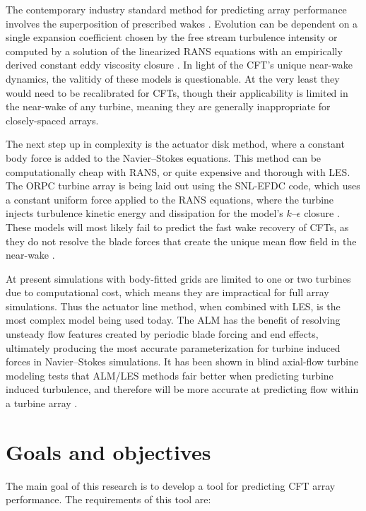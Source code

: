 The contemporary industry standard method for predicting array performance
involves the superposition of prescribed wakes \cite{Stevens2014b}. Evolution
can be dependent on a single expansion coefficient chosen by the free stream
turbulence intensity \cite{Jensen1983, Choi2013} or computed by a solution of
the linearized RANS equations with an empirically derived constant eddy
viscosity closure \cite{Ainslie1988}. In light of the CFT's unique near-wake
dynamics, the valitidy of these models is questionable. At the very least they
would need to be recalibrated for CFTs, though their applicability is limited in
the near-wake of any turbine, meaning they are generally inappropriate for
closely-spaced arrays.
	
The next step up in complexity is the actuator disk method, where a constant
body force is added to the Navier--Stokes equations. This method can be
computationally cheap with RANS, or quite expensive and thorough with LES. The
ORPC turbine array is being laid out using the SNL-EFDC code, which uses a
constant uniform force applied to the RANS equations, where the turbine injects
turbulence kinetic energy and dissipation for the model's $k$--$\epsilon$
closure \cite{Nelson2013}. These models will most likely fail to predict the
fast wake recovery of CFTs, as they do not resolve the blade forces that create
the unique mean flow field in the near-wake \cite{Bachant2015-JoT}.
	
At present simulations with body-fitted grids are limited to one or two turbines
due to computational cost, which means they are impractical for full array
simulations. Thus the actuator line method, when combined with LES, is the most
complex model being used today. The ALM has the benefit of resolving unsteady
flow features created by periodic blade forcing and end effects, ultimately
producing the most accurate parameterization for turbine induced forces in
Navier--Stokes simulations. It has been shown in blind axial-flow turbine
modeling tests that ALM/LES methods fair better when predicting turbine induced
turbulence, and therefore will be more accurate at predicting flow within a
turbine array \cite{Krogstad2013}.


\section{Goals and objectives}

The main goal of this research is to develop a tool for predicting CFT array
performance. The requirements of this tool are:

